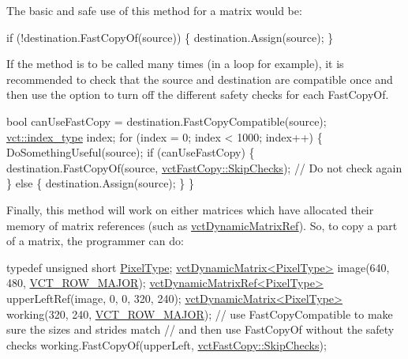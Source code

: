 The basic and safe use of this method for a matrix would be\+: 
\begin{DoxyCode}
\textcolor{keywordflow}{if} (!destination.FastCopyOf(source)) \{
    destination.Assign(source);
\}
\end{DoxyCode}


If the method is to be called many times (in a loop for example), it is recommended to check that the source and destination are compatible once and then use the option to turn off the different safety checks for each Fast\+Copy\+Of. 
\begin{DoxyCode}
\textcolor{keywordtype}{bool} canUseFastCopy = destination.FastCopyCompatible(source);
\hyperlink{namespacevct_a50405d87494dce1f22ee3930ca285ee9}{vct::index\_type} index;
\textcolor{keywordflow}{for} (index = 0; index < 1000; index++) \{
    DoSomethingUseful(source);
    \textcolor{keywordflow}{if} (canUseFastCopy) \{
        destination.FastCopyOf(source, \hyperlink{classvct_fast_copy_a221c1b0117c8dcf51332ad84f4e0fda5}{vctFastCopy::SkipChecks}); \textcolor{comment}{// Do not check
       again}
    \} \textcolor{keywordflow}{else} \{
        destination.Assign(source);
    \}
\}
\end{DoxyCode}


Finally, this method will work on either matrices which have allocated their memory of matrix references (such as \hyperlink{classvct_dynamic_matrix_ref}{vct\+Dynamic\+Matrix\+Ref}). So, to copy a part of a matrix, the programmer can do\+: 
\begin{DoxyCode}
\textcolor{keyword}{typedef} \textcolor{keywordtype}{unsigned} \textcolor{keywordtype}{short} \hyperlink{namespacesvl_filter_source_video_capture_types_a6b2f5fb1010bb41e1fb7232f88fc515f}{PixelType};
\hyperlink{classvct_dynamic_matrix}{vctDynamicMatrix<PixelType>} image(640, 480, 
      \hyperlink{vct_forward_declarations_8h_a45ba752f741240bf765417ebc8130d62}{VCT\_ROW\_MAJOR});
\hyperlink{classvct_dynamic_matrix_ref}{vctDynamicMatrixRef<PixelType>} upperLeftRef(image, 0, 0, 320, 240);
\hyperlink{classvct_dynamic_matrix}{vctDynamicMatrix<PixelType>} working(320, 240, 
      \hyperlink{vct_forward_declarations_8h_a45ba752f741240bf765417ebc8130d62}{VCT\_ROW\_MAJOR});
\textcolor{comment}{// use FastCopyCompatible to make sure the sizes and strides match}
\textcolor{comment}{// and then use FastCopyOf without the safety checks}
working.FastCopyOf(upperLeft, \hyperlink{classvct_fast_copy_a221c1b0117c8dcf51332ad84f4e0fda5}{vctFastCopy::SkipChecks});
\end{DoxyCode}



